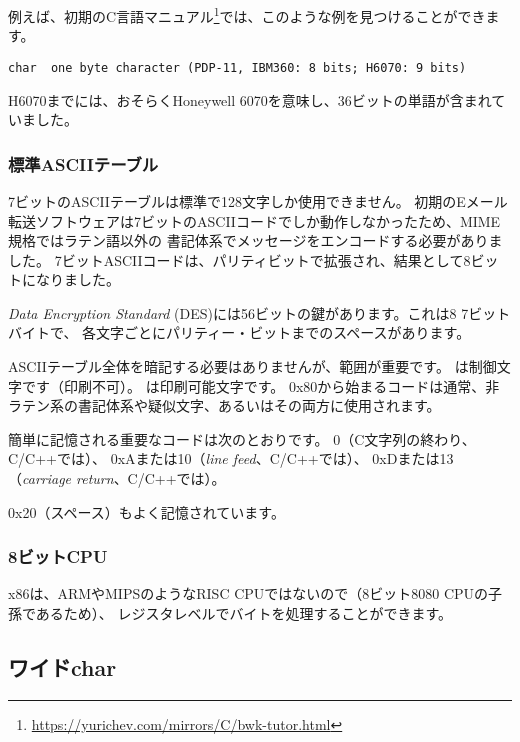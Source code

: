 例えば、初期のC言語マニュアル\footnote{\url{https://yurichev.com/mirrors/C/bwk-tutor.html}}では、このような例を見つけることができます。

\begin{lstlisting}
char  one byte character (PDP-11, IBM360: 8 bits; H6070: 9 bits)
\end{lstlisting}

H6070までには、おそらくHoneywell 6070を意味し、36ビットの単語が含まれていました。

\subsubsection{標準ASCIIテーブル}

7ビットのASCIIテーブルは標準で128文字しか使用できません。
初期のEメール転送ソフトウェアは7ビットのASCIIコードでしか動作しなかったため、\ac{MIME}規格ではラテン語以外の
書記体系でメッセージをエンコードする必要がありました。 
7ビットASCIIコードは、パリティビットで拡張され、結果として8ビットになりました。

\emph{Data Encryption Standard} (\ac{DES})には56ビットの鍵があります。これは8 7ビットバイトで、
各文字ごとにパリティー・ビットまでのスペースがあります。

\ac{ASCII}テーブル全体を暗記する必要はありませんが、範囲が重要です。
は制御文字です（印刷不可）。
は印刷可能文字です。
0x80から始まるコードは通常、非ラテン系の書記体系や疑似文字、あるいはその両方に使用されます。

簡単に記憶される重要なコードは次のとおりです。
0（C文字列の終わり、C/C++では）、
0xAまたは10（\emph{line feed}、C/C++では）、
0xDまたは13（\emph{carriage return}、C/C++では）。

0x20（スペース）もよく記憶されています。

\subsubsection{8ビットCPU}

x86は、ARMやMIPSのようなRISC CPUではないので（8ビット8080 CPUの子孫であるため）、
レジスタレベルでバイトを処理することができます。

\subsection{ワイドchar}

